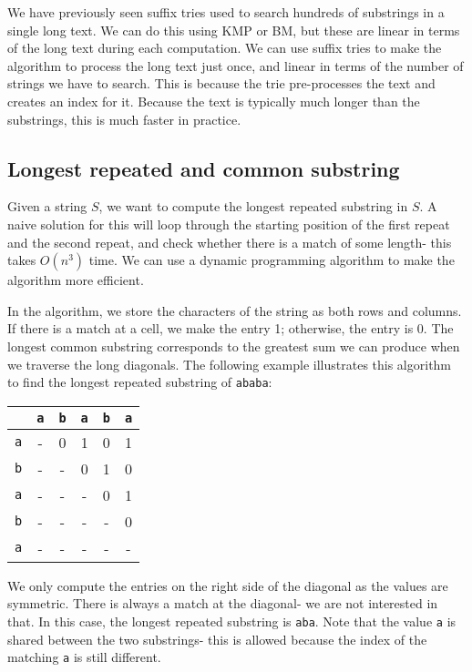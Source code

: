 \documentclass[a4paper, openany]{memoir}
\begin{document}
    We have previously seen suffix tries used to search hundreds of substrings in a single long text. We can do this using KMP or BM, but these are linear in terms of the long text during each computation. We can use suffix tries to make the algorithm to process the long text just once, and linear in terms of the number of strings we have to search. This is because the trie pre-processes the text and creates an index for it. Because the text is typically much longer than the substrings, this is much faster in practice.

    \subsection{Longest repeated and common substring}
    Given a string $S$, we want to compute the longest repeated substring in $S$. A naive solution for this will loop through the starting position of the first repeat and the second repeat, and check whether there is a match of some length- this takes $O(n^3)$ time. We can use a dynamic programming algorithm to make the algorithm more efficient.

    In the algorithm, we store the characters of the string as both rows and columns. If there is a match at a cell, we make the entry 1; otherwise, the entry is 0. The longest common substring corresponds to the greatest sum we can produce when we traverse the long diagonals. The following example illustrates this algorithm to find the longest repeated substring of \texttt{ababa}:
    \begin{table}[H]
        \centering
        \begin{tabular}{c|ccccc}
            & \texttt{a} & \texttt{b} & \texttt{a} & \texttt{b} & \texttt{a} \\
            \hline
            \texttt{a} & - & 0 & {\color{red}1} & 0 & 1 \\
            \texttt{b} & - & - & 0 & {\color{red}1} & 0 \\
            \texttt{a} & - & - & - & 0 & {\color{red}1} \\
            \texttt{b} & - & - & - & - & 0 \\
            \texttt{a} & - & - & - & - & -
        \end{tabular}
    \end{table}
    \noindent We only compute the entries on the right side of the diagonal as the values are symmetric. There is always a match at the diagonal- we are not interested in that. In this case, the longest repeated substring is \texttt{aba}. Note that the value \texttt{a} is shared between the two substrings- this is allowed because the index of the matching \texttt{a} is still different. 
\end{document}
